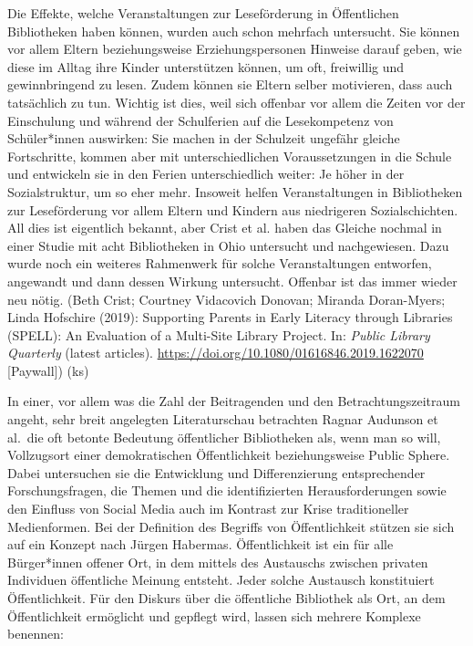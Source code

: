 \documentclass[a4paper,
fontsize=11pt,
oneside,
numbers=noperiodatend,
parskip=half-,
bibliography=totoc,
final
]{scrartcl}
\begin{document}
Die Effekte, welche Veranstaltungen zur Leseförderung in Öffentlichen
Bibliotheken haben können, wurden auch schon mehrfach untersucht. Sie
können vor allem Eltern beziehungsweise Erziehungspersonen Hinweise
darauf geben, wie diese im Alltag ihre Kinder unterstützen können, um
oft, freiwillig und gewinnbringend zu lesen. Zudem können sie Eltern
selber motivieren, dass auch tatsächlich zu tun. Wichtig ist dies, weil
sich offenbar vor allem die Zeiten vor der Einschulung und während der
Schulferien auf die Lesekompetenz von Schüler*innen auswirken: Sie
machen in der Schulzeit ungefähr gleiche Fortschritte, kommen aber mit
unterschiedlichen Voraussetzungen in die Schule und entwickeln sie in
den Ferien unterschiedlich weiter: Je höher in der Sozialstruktur, um so
eher mehr. Insoweit helfen Veranstaltungen in Bibliotheken zur
Leseförderung vor allem Eltern und Kindern aus niedrigeren
Sozialschichten. All dies ist eigentlich bekannt, aber Crist et al.
haben das Gleiche nochmal in einer Studie mit acht Bibliotheken in Ohio
untersucht und nachgewiesen. Dazu wurde noch ein weiteres Rahmenwerk für
solche Veranstaltungen entworfen, angewandt und dann dessen Wirkung
untersucht. Offenbar ist das immer wieder neu nötig. (Beth Crist;
Courtney Vidacovich Donovan; Miranda Doran-Myers; Linda Hofschire
(2019): Supporting Parents in Early Literacy through Libraries (SPELL):
An Evaluation of a Multi-Site Library Project. In: \emph{Public Library
Quarterly} (latest articles).
\url{https://doi.org/10.1080/01616846.2019.1622070} {[}Paywall{]}) (ks)

In einer, vor allem was die Zahl der Beitragenden und den
Betrachtungszeitraum angeht, sehr breit angelegten Literaturschau
betrachten Ragnar Audunson et al.~die oft betonte Bedeutung öffentlicher
Bibliotheken als, wenn man so will, Vollzugsort einer demokratischen
Öffentlichkeit beziehungsweise Public Sphere. Dabei untersuchen sie die
Entwicklung und Differenzierung entsprechender Forschungsfragen, die
Themen und die identifizierten Herausforderungen sowie den Einfluss von
Social Media auch im Kontrast zur Krise traditioneller Medienformen. Bei
der Definition des Begriffs von Öffentlichkeit stützen sie sich auf ein
Konzept nach Jürgen Habermas. Öffentlichkeit ist ein für alle
Bürger*innen offener Ort, in dem mittels des Austauschs zwischen
privaten Individuen öffentliche Meinung entsteht. Jeder solche Austausch
konstituiert Öffentlichkeit. Für den Diskurs über die öffentliche
Bibliothek als Ort, an dem Öffentlichkeit ermöglicht und gepflegt wird,
lassen sich mehrere Komplexe benennen:
\end{document}
